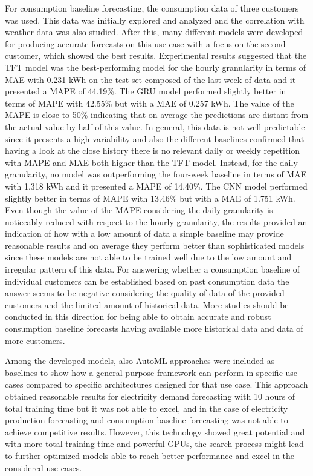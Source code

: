 For consumption baseline forecasting, the consumption data of three customers was used.
This data was initially explored and analyzed and the correlation with weather data was also studied.
After this, many different models were developed for producing accurate forecasts on this use case with a focus on the second customer, which showed the best results.
Experimental results suggested that the TFT model was the best-performing model for the hourly granularity in terms of MAE with 0.231 kWh on the test set composed of the last week of data and it presented a MAPE of 44.19\%.
The GRU model performed slightly better in terms of MAPE with 42.55\% but with a MAE of 0.257 kWh.
The value of the MAPE is close to 50\% indicating that on average the predictions are distant from the actual value by half of this value.
In general, this data is not well predictable since it presents a high variability and also the different baselines confirmed that having a look at the close history there is no relevant daily or weekly repetition with MAPE and MAE both higher than the TFT model.
Instead, for the daily granularity, no model was outperforming the four-week baseline in terms of MAE with 1.318 kWh and it presented a MAPE of 14.40\%.
The CNN model performed slightly better in terms of MAPE with 13.46\% but with a MAE of 1.751 kWh.
Even though the value of the MAPE considering the daily granularity is noticeably reduced with respect to the hourly granularity, the results provided an indication of how with a low amount of data a simple baseline may provide reasonable results and on average they perform better than sophisticated models since these models are not able to be trained well due to the low amount and irregular pattern of this data.
For answering whether a consumption baseline of individual customers can be established based on past consumption data the answer seems to be negative considering the quality of data of the provided customers and the limited amount of historical data.
More studies should be conducted in this direction for being able to obtain accurate and robust consumption baseline forecasts having available more historical data and data of more customers.

Among the developed models, also AutoML approaches were included as baselines to show how a general-purpose framework can perform in specific use cases compared to specific architectures designed for that use case.
This approach obtained reasonable results for electricity demand forecasting with 10 hours of total training time but it was not able to excel, and in the case of electricity production forecasting and consumption baseline forecasting was not able to achieve competitive results.
However, this technology showed great potential and with more total training time and powerful GPUs, the search process might lead to further optimized models able to reach better performance and excel in the considered use cases.

